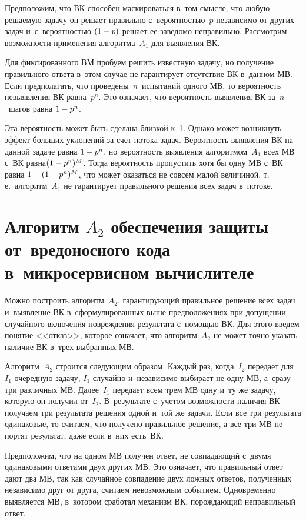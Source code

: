 \begin{multicols}{2}
  Предположим, что ВК способен маскироваться в~том смысле, что любую 
решаемую задачу он решает правильно с~вероятностью~$p$ независимо от других 
задач и~с~вероятностью $(1\hm-p)$ решает ее заведомо неправильно. Рассмотрим 
возможности применения алгоритма~$A_1$ для выявления ВК. 
  
  Для фиксированного ВМ пробуем решить известную задачу, но получение 
правильного ответа в~этом случае не гарантирует отсутствие ВК в~данном МВ. 
Если предполагать, что проведены~$n$~испытаний одного МВ, то вероятность 
невыявления ВК равна~$p^n$. Это означает, что вероятность выявления ВК 
за~$n$~шагов равна $1\hm- p^n$. 
  
  Эта вероятность может быть сделана близкой к~1. Однако может возникнуть 
эффект больших уклонений за счет потока задач. Вероятность выявления ВК на 
данной задаче равна $1\hm-p^n$, но вероятность выявления алгоритмом~$A_1$ 
всех МВ с~ВК равна\linebreak $(1\hm- p^n)^M$. Тогда вероятность пропустить хотя бы одну 
МВ с~ВК равна $1\hm- (1\hm-p^n)^M$, что может оказаться не совсем малой 
величиной, т.\,е.\ алгоритм~$A_1$ не гарантирует правильного решения всех 
задач в~потоке.
  
  \section{Алгоритм $A_2$ обеспечения защиты от~вредоносного кода 
в~микросервисном вычислителе}
  
  Можно построить алгоритм~$A_2$, гарантирующий правильное решение всех 
задач и~выявление ВК в~сформулированных выше предположениях при 
допущении случайного включения повреждения результата с~помощью ВК. Для 
этого введем понятие <<отказ>>, которое означает, что алгоритм~$A_2$ не может 
точно указать наличие ВК в~трех выбранных МВ. 
  
  Алгоритм~$A_2$ строится следующим образом. Каж\-дый раз, когда~$I_2$ 
передает для~$I_1$ очередную задачу, $I_1$ случайно и~независимо выбирает не 
одну МВ, а~сразу три различных МВ. Далее~$I_1$ передает всем трем МВ одну 
и~ту же задачу, которую он получил от~$I_2$. В~результате с~учетом 
воз\-мож\-ности наличия ВК получаем три результата решения одной и~той же 
задачи. Если все три результата одинаковые, то считаем, что получено правильное 
решение, а все три МВ не портят результат, даже если в~них есть~ВК. 
  
  Предположим, что на одном МВ получен ответ, не совпадающий с~двумя 
одинаковыми ответами  двух других МВ. Это означает, что правильный ответ дают 
два МВ, так как случайное совпадение двух ложных ответов, полученных 
независимо друг от друга, считаем невозможным событием. Одновременно 
выявляется МВ, в~котором сработал механизм ВК, порождающий неправильный 
ответ. 
{

}
\end{multicols}
